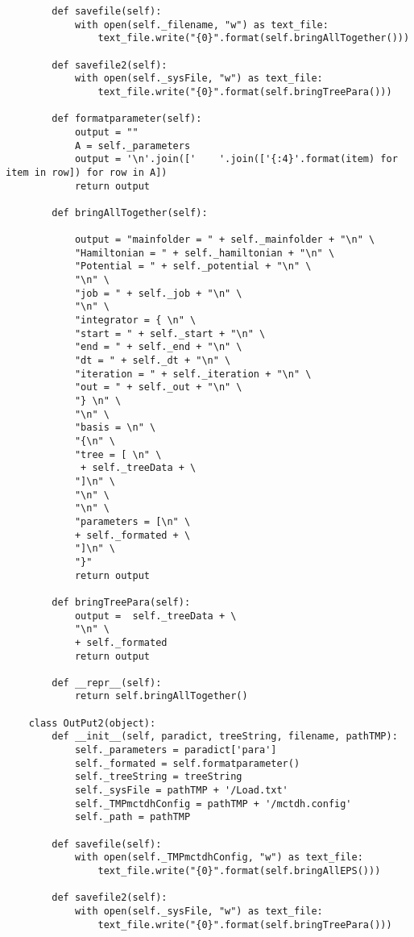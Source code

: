 \begin{verbatim}
        def savefile(self):
            with open(self._filename, "w") as text_file:
                text_file.write("{0}".format(self.bringAllTogether()))
    
        def savefile2(self):
            with open(self._sysFile, "w") as text_file:
                text_file.write("{0}".format(self.bringTreePara()))
    
        def formatparameter(self):
            output = ""
            A = self._parameters        
            output = '\n'.join(['    '.join(['{:4}'.format(item) for item in row]) for row in A])
            return output
    
        def bringAllTogether(self):
    
            output = "mainfolder = " + self._mainfolder + "\n" \
            "Hamiltonian = " + self._hamiltonian + "\n" \
            "Potential = " + self._potential + "\n" \
            "\n" \
            "job = " + self._job + "\n" \
            "\n" \
            "integrator = { \n" \
            "start = " + self._start + "\n" \
            "end = " + self._end + "\n" \
            "dt = " + self._dt + "\n" \
            "iteration = " + self._iteration + "\n" \
            "out = " + self._out + "\n" \
            "} \n" \
            "\n" \
            "basis = \n" \
            "{\n" \
            "tree = [ \n" \
             + self._treeData + \
            "]\n" \
            "\n" \
            "\n" \
            "parameters = [\n" \
            + self._formated + \
            "]\n" \
            "}"
            return output
    
        def bringTreePara(self):
            output =  self._treeData + \
            "\n" \
            + self._formated
            return output
    
        def __repr__(self):
            return self.bringAllTogether()
    
    class OutPut2(object):
        def __init__(self, paradict, treeString, filename, pathTMP):
            self._parameters = paradict['para']
            self._formated = self.formatparameter()
            self._treeString = treeString
            self._sysFile = pathTMP + '/Load.txt'
            self._TMPmctdhConfig = pathTMP + '/mctdh.config'
            self._path = pathTMP
    
        def savefile(self):
            with open(self._TMPmctdhConfig, "w") as text_file:
                text_file.write("{0}".format(self.bringAllEPS()))
    
        def savefile2(self):
            with open(self._sysFile, "w") as text_file:
                text_file.write("{0}".format(self.bringTreePara()))
    

\end{verbatim}
